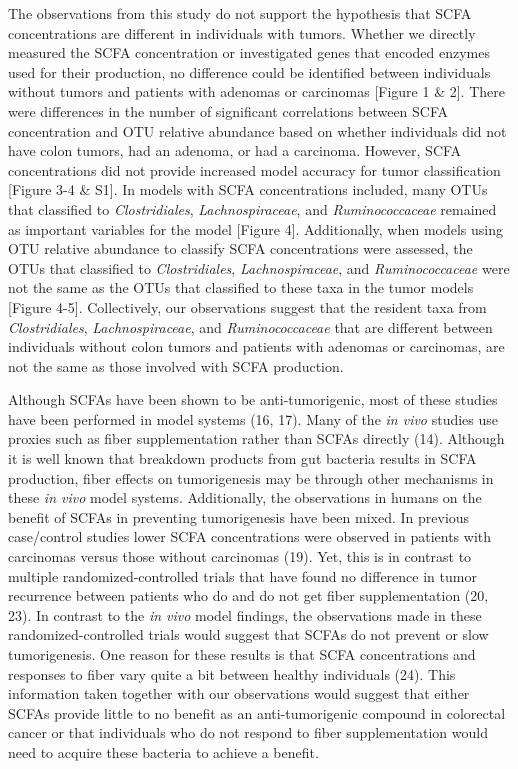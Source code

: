 \documentclass[11pt,]{article}
\begin{document}
The observations from this study do not support the hypothesis that SCFA
concentrations are different in individuals with tumors. Whether we
directly measured the SCFA concentration or investigated genes that
encoded enzymes used for their production, no difference could be
identified between individuals without tumors and patients with adenomas
or carcinomas {[}Figure 1 \& 2{]}. There were differences in the number
of significant correlations between SCFA concentration and OTU relative
abundance based on whether individuals did not have colon tumors, had an
adenoma, or had a carcinoma. However, SCFA concentrations did not
provide increased model accuracy for tumor classification {[}Figure 3-4
\& S1{]}. In models with SCFA concentrations included, many OTUs that
classified to \emph{Clostridiales}, \emph{Lachnospiraceae}, and
\emph{Ruminococcaceae} remained as important variables for the model
{[}Figure 4{]}. Additionally, when models using OTU relative abundance
to classify SCFA concentrations were assessed, the OTUs that classified
to \emph{Clostridiales}, \emph{Lachnospiraceae}, and
\emph{Ruminococcaceae} were not the same as the OTUs that classified to
these taxa in the tumor models {[}Figure 4-5{]}. Collectively, our
observations suggest that the resident taxa from \emph{Clostridiales},
\emph{Lachnospiraceae}, and \emph{Ruminococcaceae} that are different
between individuals without colon tumors and patients with adenomas or
carcinomas, are not the same as those involved with SCFA production.

Although SCFAs have been shown to be anti-tumorigenic, most of these
studies have been performed in model systems (16, 17). Many of the
\emph{in vivo} studies use proxies such as fiber supplementation rather
than SCFAs directly (14). Although it is well known that breakdown
products from gut bacteria results in SCFA production, fiber effects on
tumorigenesis may be through other mechanisms in these \emph{in vivo}
model systems. Additionally, the observations in humans on the benefit
of SCFAs in preventing tumorigenesis have been mixed. In previous
case/control studies lower SCFA concentrations were observed in patients
with carcinomas versus those without carcinomas (19). Yet, this is in
contrast to multiple randomized-controlled trials that have found no
difference in tumor recurrence between patients who do and do not get
fiber supplementation (20, 23). In contrast to the \emph{in vivo} model
findings, the observations made in these randomized-controlled trials
would suggest that SCFAs do not prevent or slow tumorigenesis. One
reason for these results is that SCFA concentrations and responses to
fiber vary quite a bit between healthy individuals (24). This
information taken together with our observations would suggest that
either SCFAs provide little to no benefit as an anti-tumorigenic
compound in colorectal cancer or that individuals who do not respond to
fiber supplementation would need to acquire these bacteria to achieve a
benefit.
\end{document}
